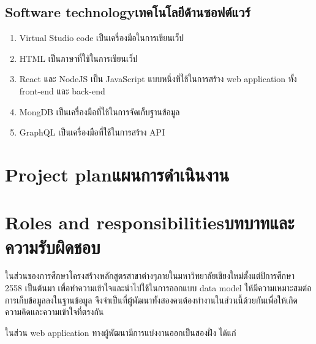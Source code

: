 \subsection{\ifenglish Software technology\else เทคโนโลยีด้านซอฟต์แวร์\fi}

\begin{enumerate}
    \item Virtual Studio code เป็นเครื่องมือในการเขียนเว็ป
    \item HTML เป็นภาษาที่ใช้ในการเขียนเว็ป
    \item React และ NodeJS เป็น JavaScript แบบหนึ่งที่ใช้ในการสร้าง web application ทั้ง front-end และ back-end  
    \item MongDB เป็นเครื่องมือที่ใช้ในการจัดเก็บฐานข้อมูล
    \item GraphQL เป็นเครื่องมือที่ใช้ในการสร้าง API 
\end{enumerate}

\section{\ifenglish Project plan\else แผนการดำเนินงาน\fi}


\section{\ifenglish Roles and responsibilities\else บทบาทและความรับผิดชอบ\fi}

ในส่วนของการศึกษาโครงสร้างหลักสูตรสาขาต่างๆภายในมหาวิทยาลัยเชียงใหม่ตั้งแต่ปีการศึกษา 2558 เป็นต้นมา เพื่อทำความเข้าใจและนําไปใช้ในการออกแบบ data model ให้มีความเหมาะสมต่อการเก็บข้อมูลลงในฐานข้อมูล จึงจำเป็นที่ผู้พัฒนาทั้งสองคนต้องทำงานในส่วนนี้ด้วยกันเพื่อให้เกิดความคิดและความเข้าใจที่ตรงกัน 
	
ในส่วน web application ทางผู้พัฒนามีการแบ่งงานออกเป็นสองฝั่ง ได้แก่ 

